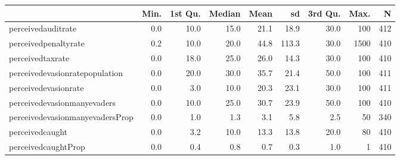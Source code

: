 \begin{table}[ht]
\centering
\begin{tabular}{lrrrrrrrr}
  \hline
 & Min. & 1st Qu. & Median & Mean & sd & 3rd Qu. & Max. & N \\ 
  \hline
perceivedauditrate & 0.0 & 10.0 & 15.0 & 21.1 & 18.9 & 30.0 & 100 & 412 \\ 
  perceivedpenaltyrate & 0.2 & 10.0 & 20.0 & 44.8 & 113.3 & 30.0 & 1500 & 410 \\ 
  perceivedtaxrate & 0.0 & 18.0 & 25.0 & 26.0 & 14.3 & 30.0 & 100 & 410 \\ 
  perceivedevasionratepopulation & 0.0 & 20.0 & 30.0 & 35.7 & 21.4 & 50.0 & 100 & 411 \\ 
  perceivedevasionrate & 0.0 & 3.0 & 10.0 & 20.3 & 23.1 & 30.0 & 100 & 411 \\ 
  perceivedevasionmanyevaders & 0.0 & 10.0 & 25.0 & 30.7 & 23.9 & 50.0 & 100 & 410 \\ 
  perceivedevasionmanyevadersProp & 0.0 & 1.0 & 1.3 & 3.1 & 5.8 & 2.5 & 50 & 340 \\ 
  perceivedcaught & 0.0 & 3.2 & 10.0 & 13.3 & 13.8 & 20.0 & 80 & 410 \\ 
  perceivedcaughtProp & 0.0 & 0.4 & 0.8 & 0.7 & 0.3 & 1.0 &  1 & 410 \\ 
   \hline
\end{tabular}
\end{table}
